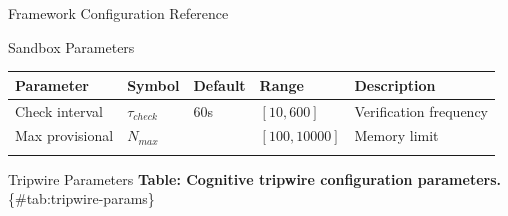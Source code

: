 \documentclass[
  ignorenonframetext,
]{beamer}
\newcounter{none} %
\begin{document}
\begin{frame}[fragile]{Framework Configuration Reference}
\begin{block}{Sandbox Parameters}
{\def\LTcaptype{none} %
\begin{longtable}[]{@{}
  >{\raggedright\arraybackslash}p{}
  >{\raggedright\arraybackslash}p{}
  >{\raggedright\arraybackslash}p{}
  >{\raggedright\arraybackslash}p{}
  >{\raggedright\arraybackslash}p{}@{}}
\toprule\noalign{}
\begin{minipage}[b]{\linewidth}\raggedright
Parameter
\end{minipage} & \begin{minipage}[b]{\linewidth}\raggedright
Symbol
\end{minipage} & \begin{minipage}[b]{\linewidth}\raggedright
Default
\end{minipage} & \begin{minipage}[b]{\linewidth}\raggedright
Range
\end{minipage} & \begin{minipage}[b]{\linewidth}\raggedright
Description
\end{minipage} \\
\midrule\noalign{}
\endhead
Check interval & \(\tau_{check}\) & 60s & \([10, 600]\) & Verification
frequency \\
Max provisional & \(N_{max}\) & 1000 & \([100, 10000]\) & Memory
limit \\
\bottomrule\noalign{}
\end{longtable}
}
\end{block}

\begin{block}{Tripwire Parameters}
\protect{}\label{sec:tripwire-params}
\textbf{Table: Cognitive tripwire configuration parameters.}
\{\#tab:tripwire-params\}


\end{block}
\end{frame}
\end{document}
